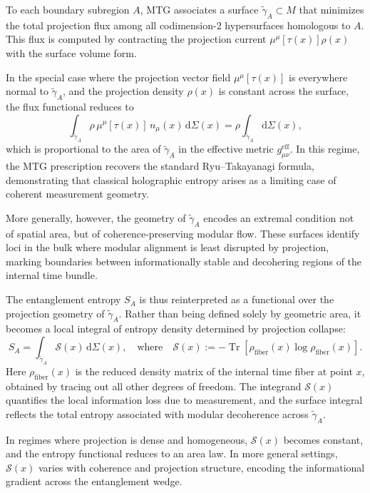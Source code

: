 \documentclass[11pt]{article}
\begin{document}
To each boundary subregion \( A \), MTG associates a surface \( \widetilde{\gamma}_A \subset M \) that minimizes the total projection flux among all codimension-2 hypersurfaces homologous to \( A \). This flux is computed by contracting the projection current \( \mu^\mu[\tau(x)] \rho(x) \) with the surface volume form. 

In the special case where the projection vector field \( \mu^\mu[\tau(x)] \) is everywhere normal to \( \widetilde{\gamma}_A \), and the projection density \( \rho(x) \) is constant across the surface, the flux functional reduces to
\[
\int_{\widetilde{\gamma}_A} \rho \, \mu^\mu[\tau(x)] \, n_\mu(x) \, \mathrm{d}\Sigma(x) = \rho \int_{\widetilde{\gamma}_A} \mathrm{d}\Sigma(x),
\]
which is proportional to the area of \( \widetilde{\gamma}_A \) in the effective metric \( g^{\mathrm{eff}}_{\mu\nu} \). In this regime, the MTG prescription recovers the standard Ryu--Takayanagi formula, demonstrating that classical holographic entropy arises as a limiting case of coherent measurement geometry.

More generally, however, the geometry of \( \widetilde{\gamma}_A \) encodes an extremal condition not of spatial area, but of coherence-preserving modular flow. These surfaces identify loci in the bulk where modular alignment is least disrupted by projection, marking boundaries between informationally stable and decohering regions of the internal time bundle.

The entanglement entropy \( S_A \) is thus reinterpreted as a functional over the projection geometry of \( \widetilde{\gamma}_A \). Rather than being defined solely by geometric area, it becomes a local integral of entropy density determined by projection collapse:
\begin{equation}
S_A = \int_{\widetilde{\gamma}_A} \mathcal{S}(x) \, \mathrm{d}\Sigma(x), \quad \text{where} \quad \mathcal{S}(x) := -\operatorname{Tr}\left[ \rho_{\text{fiber}}(x) \log \rho_{\text{fiber}}(x) \right].
\end{equation}
Here \( \rho_{\text{fiber}}(x) \) is the reduced density matrix of the internal time fiber at point \( x \), obtained by tracing out all other degrees of freedom. The integrand \( \mathcal{S}(x) \) quantifies the local information loss due to measurement, and the surface integral reflects the total entropy associated with modular decoherence across \( \widetilde{\gamma}_A \).

In regimes where projection is dense and homogeneous, \( \mathcal{S}(x) \) becomes constant, and the entropy functional reduces to an area law. In more general settings, \( \mathcal{S}(x) \) varies with coherence and projection structure, encoding the informational gradient across the entanglement wedge.
\end{document}
